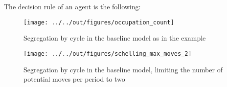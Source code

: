 \documentclass[11pt, a4paper, leqno]{article}
\begin{document}
The decision rule of an agent is the following:


\begin{figure}
    \caption{Segregation by cycle in the baseline \citet{Schelling69} model as in the \citet{StachurskiSargent13} example}
    
    \texttt{[image: ../../out/figures/occupation\_count]}

\end{figure}


\begin{figure}
    \caption{Segregation by cycle in the baseline \citet{Schelling69} model, limiting the number of potential moves per period to two}
    
    \texttt{[image: ../../out/figures/schelling\_max\_moves\_2]}

\end{figure}





\printbibliography
{}





\end{document}
